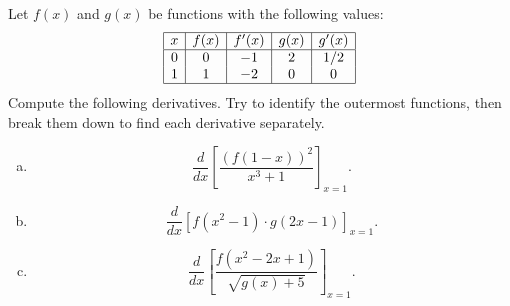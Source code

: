 \documentclass[10pt]{article}
\begin{document}
Let $f(x)$ and $g(x)$ be functions with the following values:$$
\begin{array}{|c|c|c|c|c|}
\hline
x & f(x) & f'(x) & g(x) & g'(x) \\
\hline
0 & 0 & -1 & 2 & 1/2 \\
1 & 1 & -2 & 0 & 0\\
\hline
\end{array}
$$
Compute the following derivatives. Try to identify the outermost functions, then break them down to find each derivative separately.
\begin{enumerate}[(a)]
    \item $$\frac{d}{dx} \left[ \frac{ (f(1-x))^2 }{ x^3 + 1 } \right]_{x=1}.$$
    \item $$\frac{d}{dx} \left[ f(x^2 - 1) \cdot g(2x - 1) \right]_{x=1}.$$
    \item $$\frac{d}{dx} \left[ \frac{f(x^2-2x+1)}{\sqrt{g(x) + 5}} \right]_{x=1}.$$
\end{enumerate}
\end{document}
